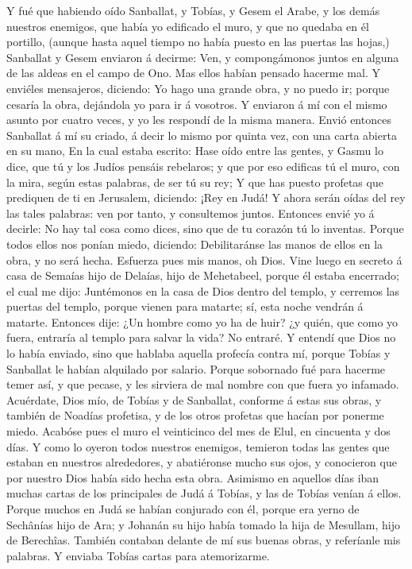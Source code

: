 Y fué que habiendo oído Sanballat, y Tobías, y Gesem el
Arabe, y los demás nuestros enemigos, que había yo edificado el muro, y
que no quedaba en él portillo, (aunque hasta aquel tiempo no había
puesto en las puertas las hojas,)  Sanballat y Gesem
enviaron á decirme: Ven, y compongámonos juntos en alguna de las aldeas
en el campo de Ono. Mas ellos habían pensado hacerme mal.  Y
enviéles mensajeros, diciendo: Yo hago una grande obra, y no puedo ir;
porque cesaría la obra, dejándola yo para ir á vosotros.  Y
enviaron á mí con el mismo asunto por cuatro veces, y yo les respondí de
la misma manera.  Envió entonces Sanballat á mí su criado, á
decir lo mismo por quinta vez, con una carta abierta en su mano,
 En la cual estaba escrito: Hase oído entre las gentes, y
Gasmu lo dice, que tú y los Judíos pensáis rebelaros; y que por eso
edificas tú el muro, con la mira, según estas palabras, de ser tú su
rey;  Y que has puesto profetas que prediquen de ti en
Jerusalem, diciendo: ¡Rey en Judá! Y ahora serán oídas del rey las tales
palabras: ven por tanto, y consultemos juntos.  Entonces
envié yo á decirle: No hay tal cosa como dices, sino que de tu corazón
tú lo inventas.  Porque todos ellos nos ponían miedo,
diciendo: Debilitaránse las manos de ellos en la obra, y no será hecha.
Esfuerza pues mis manos, oh Dios.  Vine luego en secreto á
casa de Semaías hijo de Delaías, hijo de Mehetabeel, porque él estaba
encerrado; el cual me dijo: Juntémonos en la casa de Dios dentro del
templo, y cerremos las puertas del templo, porque vienen para matarte;
sí, esta noche vendrán á matarte.  Entonces dije: ¿Un
hombre como yo ha de huir? ¿y quién, que como yo fuera, entraría al
templo para salvar la vida? No entraré.  Y entendí que Dios
no lo había enviado, sino que hablaba aquella profecía contra mí, porque
Tobías y Sanballat le habían alquilado por salario.  Porque
sobornado fué para hacerme temer así, y que pecase, y les sirviera de
mal nombre con que fuera yo infamado.  Acuérdate, Dios mío,
de Tobías y de Sanballat, conforme á estas sus obras, y también de
Noadías profetisa, y de los otros profetas que hacían por ponerme miedo.
 Acabóse pues el muro el veinticinco del mes de Elul, en
cincuenta y dos días.  Y como lo oyeron todos nuestros
enemigos, temieron todas las gentes que estaban en nuestros alrededores,
y abatiéronse mucho sus ojos, y conocieron que por nuestro Dios había
sido hecha esta obra.  Asimismo en aquellos días iban
muchas cartas de los principales de Judá á Tobías, y las de Tobías
venían á ellos.  Porque muchos en Judá se habían conjurado
con él, porque era yerno de Sechânías hijo de Ara; y Johanán su hijo
había tomado la hija de Mesullam, hijo de Berechîas. 
También contaban delante de mí sus buenas obras, y referíanle mis
palabras. Y enviaba Tobías cartas para atemorizarme.

